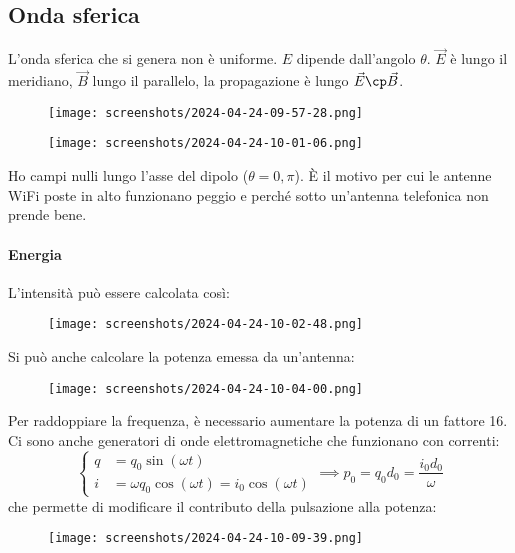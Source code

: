 \subsection{Onda sferica}
L'onda sferica che si genera non è uniforme. \(E\) dipende dall'angolo \(\theta\). \(\vec{E}\) è lungo il meridiano, \(\vec{B}\) lungo il parallelo, la propagazione è lungo \(\vec{E} \cp \vec{B}\).
\begin{figure}[H]
	\centering
	\texttt{[image: screenshots/2024-04-24-09-57-28.png]}
\end{figure}
\begin{figure}[H]
	\centering
	\texttt{[image: screenshots/2024-04-24-10-01-06.png]}
\end{figure}
Ho campi nulli lungo l'asse del dipolo (\(\theta = 0, \pi \)). È il motivo per cui le antenne WiFi poste in alto funzionano peggio e perché sotto un'antenna telefonica non prende bene.

\paragraph{Energia}
L'intensità può essere calcolata così:
\begin{figure}[H]
	\centering
	\texttt{[image: screenshots/2024-04-24-10-02-48.png]}
\end{figure}
Si può anche calcolare la potenza emessa da un'antenna:
\begin{figure}[H]
	\centering
	\texttt{[image: screenshots/2024-04-24-10-04-00.png]}
\end{figure}
Per raddoppiare la frequenza, è necessario aumentare la potenza di un fattore 16. Ci sono anche generatori di onde elettromagnetiche che funzionano con correnti:
\begin{equation}
	\begin{cases}
		q &= q_0 \sin (\omega t)\\
		i &= \omega q_0 \cos (\omega t) = i_0 \cos (\omega t)
	\end{cases}
	\implies p_0 = q_0 d_0 = \frac{i_0 d_0}{\omega }
\end{equation}
che permette di modificare il contributo della pulsazione alla potenza:
\begin{figure}[H]
	\centering
	\texttt{[image: screenshots/2024-04-24-10-09-39.png]}
\end{figure}